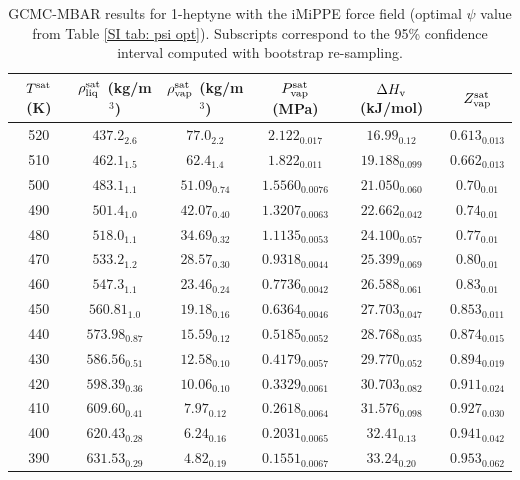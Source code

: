 \documentclass[journal=jctc,manuscript=article]{achemso}
\begin{document}
\begin{table}[htb!]
	\caption{GCMC-MBAR results for 1-heptyne with the iMiPPE force field (optimal $\psi$ value from Table \ref{SI tab: psi opt}). Subscripts correspond to the 95\% confidence interval computed with bootstrap re-sampling.}
	\begin{center}
		\begin{tabular}{|c|c|c|c|c|c|}
			\hline
			$T^{\rm sat}$ (K) & $\rho_{\rm liq}^{\rm sat}$ (kg/m$^3$) & $\rho_{\rm vap}^{\rm sat}$ (kg/m$^3$) & $P_{\rm vap}^{\rm sat}$ (MPa) & $\Delta H_{\rm v}$ (kJ/mol) & $Z_{\rm vap}^{\rm sat}$ \\ \hline
			520 & $437.2_{2.6}$ & $77.0_{2.2}$ & $2.122_{0.017}$ & $16.99_{0.12}$ & $0.613_{0.013}$ \\
			510 & $462.1_{1.5}$ & $62.4_{1.4}$ & $1.822_{0.011}$ & $19.188_{0.099}$ & $0.662_{0.013}$ \\
			500 & $483.1_{1.1}$ & $51.09_{0.74}$ & $1.5560_{0.0076}$ & $21.050_{0.060}$ & $0.70_{0.01}$ \\
			490 & $501.4_{1.0}$ & $42.07_{0.40}$ & $1.3207_{0.0063}$ & $22.662_{0.042}$ & $0.74_{0.01}$ \\
			480 & $518.0_{1.1}$ & $34.69_{0.32}$ & $1.1135_{0.0053}$ & $24.100_{0.057}$ & $0.77_{0.01}$ \\
			470 & $533.2_{1.2}$ & $28.57_{0.30}$ & $0.9318_{0.0044}$ & $25.399_{0.069}$ & $0.80_{0.01}$ \\
			460 & $547.3_{1.1}$ & $23.46_{0.24}$ & $0.7736_{0.0042}$ & $26.588_{0.061}$ & $0.83_{0.01}$ \\
			450 & $560.81_{1.0}$ & $19.18_{0.16}$ & $0.6364_{0.0046}$ & $27.703_{0.047}$ & $0.853_{0.011}$ \\
			440 & $573.98_{0.87}$ & $15.59_{0.12}$ & $0.5185_{0.0052}$ & $28.768_{0.035}$ & $0.874_{0.015}$ \\
			430 & $586.56_{0.51}$ & $12.58_{0.10}$ & $0.4179_{0.0057}$ & $29.770_{0.052}$ & $0.894_{0.019}$ \\
			420 & $598.39_{0.36}$ & $10.06_{0.10}$ & $0.3329_{0.0061}$ & $30.703_{0.082}$ & $0.911_{0.024}$ \\
			410 & $609.60_{0.41}$ & $7.97_{0.12}$ & $0.2618_{0.0064}$ & $31.576_{0.098}$ & $0.927_{0.030}$ \\
			400 & $620.43_{0.28}$ & $6.24_{0.16}$ & $0.2031_{0.0065}$ & $32.41_{0.13}$ & $0.941_{0.042}$ \\
			390 & $631.53_{0.29}$ & $4.82_{0.19}$ & $0.1551_{0.0067}$ & $33.24_{0.20}$ & $0.953_{0.062}$ \\
			\hline
		\end{tabular}
	\end{center}
\end{table}
\end{document}
